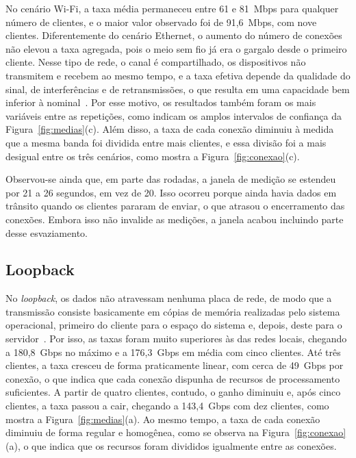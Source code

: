 \documentclass[12pt]{article}
\begin{document}
No cenário Wi-Fi, a taxa média permaneceu entre 61 e 81~Mbps para qualquer
número de clientes, e o maior valor observado foi de 91,6~Mbps, com nove
clientes. Diferentemente do cenário Ethernet, o aumento do número de conexões não
elevou a taxa agregada, pois o meio sem fio já era o gargalo desde o primeiro
cliente. Nesse tipo de rede, o canal é compartilhado, os dispositivos não
transmitem e recebem ao mesmo tempo, e a taxa efetiva depende da qualidade do
sinal, de interferências e de retransmissões, o que resulta em uma capacidade
bem inferior à nominal~\cite{kurose:21,tanenbaum:21}. Por esse motivo, os resultados também foram os mais
variáveis entre as repetições, como indicam os amplos intervalos de confiança
da Figura~\ref{fig:medias}(c). Além disso, a taxa de cada conexão diminuiu à
medida que a mesma banda foi dividida entre mais clientes, e essa divisão foi a
mais desigual entre os três cenários, como mostra a
Figura~\ref{fig:conexao}(c).

Observou-se ainda que, em parte das rodadas, a janela de medição se estendeu
por 21 a 26 segundos, em vez de 20. Isso ocorreu porque ainda havia dados em
trânsito quando os clientes pararam de enviar, o que atrasou o encerramento das
conexões. Embora isso não invalide as medições, a janela acabou incluindo parte
desse esvaziamento.

\subsection{Loopback}

No \textit{loopback}, os dados não atravessam nenhuma placa de rede, de modo
que a transmissão consiste basicamente em cópias de memória realizadas pelo
sistema operacional, primeiro do cliente para o espaço do sistema e, depois,
deste para o servidor~\cite{stevens:03,kerrisk:10}. Por isso, as taxas foram muito superiores às das redes
locais, chegando a 180,8~Gbps no máximo e a 176,3~Gbps em média com cinco
clientes. Até três clientes, a taxa cresceu de forma praticamente linear, com
cerca de 49~Gbps por conexão, o que indica que cada conexão dispunha de
recursos de processamento suficientes. A partir de quatro clientes, contudo, o
ganho diminuiu e, após cinco clientes, a taxa passou a cair, chegando a
143,4~Gbps com dez clientes, como mostra a Figura~\ref{fig:medias}(a). Ao
mesmo tempo, a taxa de cada conexão diminuiu de forma regular e homogênea, como
se observa na Figura~\ref{fig:conexao}(a), o que indica que os recursos foram
divididos igualmente entre as conexões.
\end{document}
